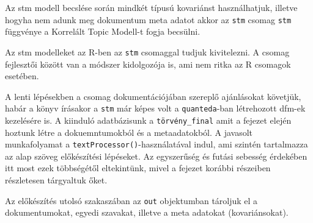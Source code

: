 \documentclass[
]{book}
\newenvironment{Shaded}{\begin{snugshade}}{\end{snugshade}}
\newcommand{\AttributeTok}[1]{\textcolor[rgb]{0.77,0.63,0.00}{#1}}
\newcommand{\CommentTok}[1]{\textcolor[rgb]{0.56,0.35,0.01}{\textit{#1}}}
\newcommand{\ConstantTok}[1]{\textcolor[rgb]{0.00,0.00,0.00}{#1}}
\newcommand{\FunctionTok}[1]{\textcolor[rgb]{0.00,0.00,0.00}{#1}}
\newcommand{\NormalTok}[1]{#1}
\newcommand{\OtherTok}[1]{\textcolor[rgb]{0.56,0.35,0.01}{#1}}
\newcommand{\SpecialCharTok}[1]{\textcolor[rgb]{0.00,0.00,0.00}{#1}}
\newcommand{\StringTok}[1]{\textcolor[rgb]{0.31,0.60,0.02}{#1}}
\begin{document}
Az stm modell becslése során mindkét típusú kovariánst használhatjuk,
illetve hogyha nem adunk meg dokumentum meta adatot akkor az
\texttt{stm} csomag \texttt{stm} függvénye a Korrelált Topic Modell-t
fogja becsülni.

Az stm modelleket az R-ben az \texttt{stm} csomaggal tudjuk kivitelezni.
A csomag fejlesztői között van a módszer kidolgozója is, ami nem ritka
az R csomagok esetében.

A lenti lépésekben a csomag dokumentációjában szereplő ajánlásokat
követjük, habár a könyv írásakor a \texttt{stm} már képes volt a
\texttt{quanteda}-ban létrehozott dfm-ek kezelésére is. A kiinduló
adatbázisunk a \texttt{törvény\_final} amit a fejezet elején hoztunk
létre a dokuemntumokból és a metaadatokból. A javasolt munkafolyamat a
\texttt{textProcessor()}-használatával indul, ami szintén tartalmazza az
alap szöveg előkészítési lépéseket. Az egyszerűség és futási sebesség
érdekében itt most ezek többségétől eltekintünk, mivel a fejezet korábbi
részeiben részletesen tárgyaltuk őket.

Az előkészítés utolsó szakaszában az \texttt{out} objektumban tároljuk
el a dokumentumokat, egyedi szavakat, illetve a meta adatokat
(kovariánsokat).

\begin{Shaded}
\end{Shaded}
\end{document}
